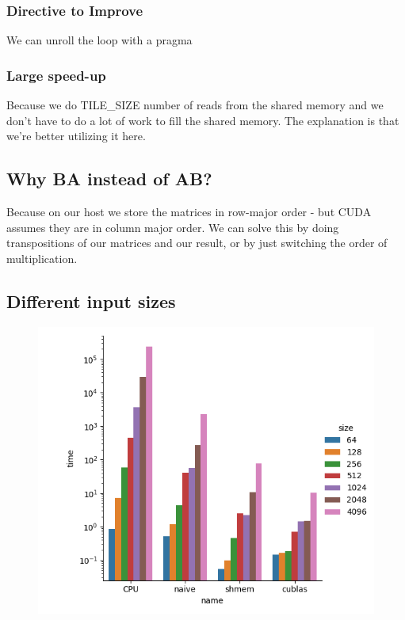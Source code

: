 \documentclass{article}
\begin{document}
\subsubsection{Directive to Improve}%
\label{ssub:directive_to_improve}

We can unroll the loop with a pragma

\subsubsection{Large speed-up}%
\label{ssub:large_speed_up}

Because we do TILE\_SIZE number of reads from the shared
memory and we don't have to do a lot of work to fill the
shared memory. The explanation is that we're better utilizing
it here.


\subsection{Why BA instead of AB?}%
\label{sub:why_ba_instead_of_ab_}
Because on our host we store the matrices in row-major order - but CUDA assumes they are in column major order. We can solve this by doing transpositions of our matrices and our result, or by just switching the order of multiplication.

\subsection{Different input sizes}%
\label{sub:different_input_sizes}



\begin{figure}[H]
  \centering
  \includegraphics[width=0.98\linewidth]{ex_3/ex_bonus/simulation-time.png}
  \label{fig:}
\end{figure}
\end{document}
